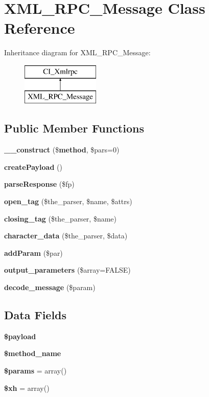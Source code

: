 \section{X\-M\-L\-\_\-\-R\-P\-C\-\_\-\-Message Class Reference}
\label{class_x_m_l___r_p_c___message}
Inheritance diagram for X\-M\-L\-\_\-\-R\-P\-C\-\_\-\-Message\-:\begin{figure}[H]
\begin{center}
\leavevmode
\includegraphics[height=2.000000cm]{class_x_m_l___r_p_c___message}
\end{center}
\end{figure}
\subsection*{Public Member Functions}
\begin{DoxyCompactItemize}
\item 
{\bf \-\_\-\-\_\-construct} (\${\bf method}, \$pars=0)
\item 
{\bf create\-Payload} ()
\item 
{\bf parse\-Response} (\$fp)
\item 
{\bf open\-\_\-tag} (\$the\-\_\-parser, \$name, \$attrs)
\item 
{\bf closing\-\_\-tag} (\$the\-\_\-parser, \$name)
\item 
{\bf character\-\_\-data} (\$the\-\_\-parser, \$data)
\item 
{\bf add\-Param} (\$par)
\item 
{\bf output\-\_\-parameters} (\$array=F\-A\-L\-S\-E)
\item 
{\bf decode\-\_\-message} (\$param)
\end{DoxyCompactItemize}
\subsection*{Data Fields}
\begin{DoxyCompactItemize}
\item 
{\bf \$payload}
\item 
{\bf \$method\-\_\-name}
\item 
{\bf \$params} = array()
\item 
{\bf \$xh} = array()
\end{DoxyCompactItemize}


